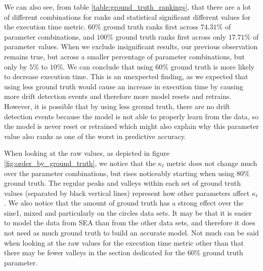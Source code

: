 We can also see, from table \ref{table:ground_truth_rankings}, that there are a lot of different combinations for ranks and statistical significant different values for the execution time metric. $60\%$ ground truth ranks first across $74.31\%$ of parameter combinations, and $100\%$ ground truth ranks first across only $17.71\%$ of parameter values. When we exclude insignificant results, our previous observation remains true, but across a smaller percentage of parameter combinations, but only by $5\%$ to $10\%$. We can conclude that using $60\%$ ground truth is more likely to decrease execution time. This is an unexpected finding, as we expected that using less ground truth would cause an increase in execution time by causing more drift detection events and therefore more model resets and retrains. However, it is possible that by using less ground truth, there are no drift detection events because the model is not able to properly learn from the data, so the model is never reset or retrained which might also explain why this parameter value also ranks as one of the worst in predictive accuracy.

When looking at the raw values, as depicted in figure \ref{fig:order_by_ground_truth}, we notice that the $\kappa_t$ metric does not change much over the parameter combinations, but rises noticeably starting when using $80\%$ ground truth. The regular peaks and valleys within each set of ground truth values (separated by black vertical lines) represent how other parameters affect $\kappa_t$. We also notice that the amount of ground truth has a strong effect over the sine1, mixed and particularly on the circles data sets. It may be that it is easier to model the data from SEA than from the other data sets, and therefore it does not need as much ground truth to build an accurate model. Not much can be said when looking at the raw values for the execution time metric other than that there may be fewer valleys in the section dedicated for the $60\%$ ground truth parameter.


